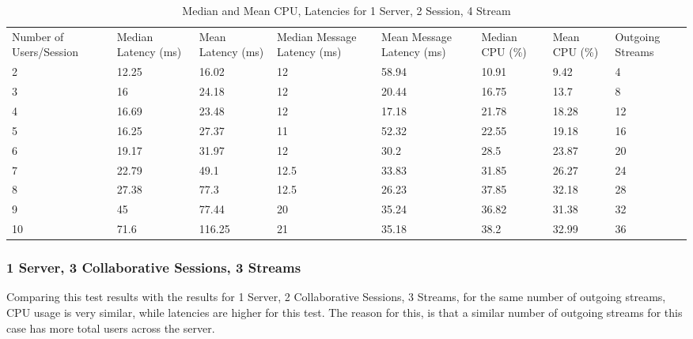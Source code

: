\begin{table}
\caption{Median and Mean CPU, Latencies for 1 Server, 2 Session, 4 Stream}
\label{table:1serv_2sess_4str}
\begin{tabu} to\linewidth{|X[c]|X[c]|X[c]|X[c]|X[c]|X[c]|X[c]|X[c]|}
\everyrow{\hline}
\hline
Number of Users/Session & Median Latency (ms) & Mean Latency (ms) & Median Message Latency (ms) & Mean Message Latency (ms) & Median CPU (\%) & Mean CPU (\%) & Outgoing Streams\\
2 & 12.25 & 16.02 & 12 & 58.94 & 10.91 & 9.42 & 4 \\
3 & 16 & 24.18 & 12 & 20.44 & 16.75 & 13.7 & 8 \\
4 & 16.69 & 23.48 & 12 & 17.18 & 21.78 & 18.28 & 12 \\
5 & 16.25 & 27.37 & 11 & 52.32 & 22.55 & 19.18 & 16 \\
6 & 19.17 & 31.97 & 12 & 30.2 & 28.5 & 23.87 & 20 \\
7 & 22.79 & 49.1 & 12.5 & 33.83 & 31.85 & 26.27 & 24 \\
8 & 27.38 & 77.3 & 12.5 & 26.23 & 37.85 & 32.18 & 28 \\
9 & 45 & 77.44 & 20 & 35.24 & 36.82 & 31.38 & 32 \\
10 & 71.6 & 116.25 & 21 & 35.18 & 38.2 & 32.99 & 36 \\
\end{tabu}
\end{table}

\clearpage\subsubsection{1 Server, 3 Collaborative Sessions, 3 Streams}
\label{sec:1serv_3sess_3str}

Comparing this test results with the results for 1 Server, 2 Collaborative Sessions, 3 Streams, for the same number of outgoing streams, CPU usage is very similar, while latencies are higher for this test. The reason for this, is that a similar number of outgoing streams for this case has more total users across the server.

